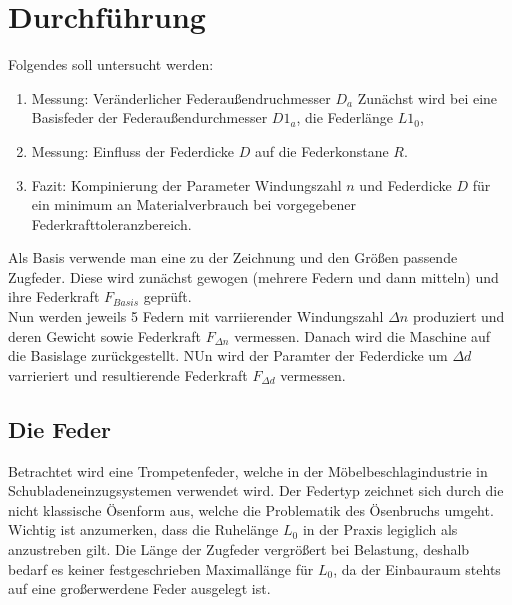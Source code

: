 \section{Durchführung}
\label{sec:Durchfuehrung}
Folgendes soll untersucht werden:
\begin{enumerate}
    \item Messung: Veränderlicher Federaußendruchmesser $D_a$
    Zunächst wird bei eine Basisfeder der Federaußendurchmesser $D1_a$, die
    Federlänge $L1_0$, 

    \item Messung: Einfluss der Federdicke $D$ auf die Federkonstane $R$.
    \item Fazit: Kompinierung der Parameter Windungszahl $n$ und Federdicke $D$ für ein minimum
    an Materialverbrauch bei vorgegebener Federkrafttoleranzbereich.
\end{enumerate}
Als Basis verwende man eine zu der Zeichnung und den Größen passende Zugfeder. Diese
wird zunächst gewogen (mehrere Federn und dann mitteln) und ihre Federkraft $F_{Basis}$
geprüft.\\
Nun werden jeweils 5 Federn mit varriierender Windungszahl $\Delta n$ produziert und deren
Gewicht sowie Federkraft $F_{\Delta n}$ vermessen.
Danach wird die Maschine auf die Basislage zurückgestellt. NUn wird der Paramter 
der Federdicke um $\Delta d$ varrieriert und resultierende Federkraft $F_{\Delta d}$
vermessen.  


\subsection{Die Feder}
Betrachtet wird eine Trompetenfeder, welche in der Möbelbeschlagindustrie in Schubladeneinzugsystemen
verwendet wird. 
Der Federtyp zeichnet sich durch die nicht klassische Ösenform aus, welche die Problematik des Ösenbruchs umgeht.\\

Wichtig ist anzumerken, dass die Ruhelänge $L_0$ in der Praxis legiglich als anzustreben gilt.
Die Länge der Zugfeder vergrößert bei Belastung, deshalb bedarf es keiner festgeschrieben Maximallänge für $L_0$, da
der Einbauraum stehts auf eine großerwerdene Feder ausgelegt ist.  
\newline

